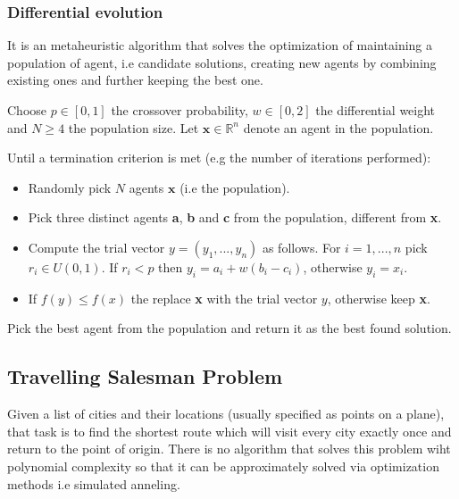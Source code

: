\subsubsection*{Differential evolution}

It is an metaheuristic algorithm that solves the optimization of maintaining a population of agent, i.e candidate solutions, creating
new agents by combining existing ones and further keeping the best one.

Choose $p \in [0, 1]$ the crossover probability, $w \in [0, 2]$ the differential weight and $N \geq 4$ the population size. Let $\textbf{x} \in \mathbb{R}^n $ denote an agent in the population.

Until a termination criterion is met (e.g the number of iterations performed):
\begin{itemize}
    \item Randomly pick $N$ agents $\textbf{x}$ (i.e the population).
    \item Pick three distinct agents \textbf{a}, \textbf{b} and \textbf{c} from the population, different from \textbf{x}.
    \item Compute the trial vector $y = (y_1, ..., y_n)$ as follows. For $i = 1, ..., n$ pick $r_i \in U(0, 1)$. If $r_i < p$ then $y_i = a_i + w(b_i - c_i)$, otherwise $y_i = x_i$.
    \item If $f(y) \leq f(x)$ the replace \textbf{x} with the  trial vector $y$, otherwise keep \textbf{x}.
\end{itemize}

Pick the best agent from the population and return it as the best found solution.

\subsection*{Travelling Salesman Problem}

Given a list of cities and their locations (usually specified as points on a plane), that task is to find the shortest route which will visit every city exactly once and return to the point of origin. There is no algorithm that solves this problem wiht polynomial complexity so that it can be approximately solved via optimization methods i.e simulated anneling.
